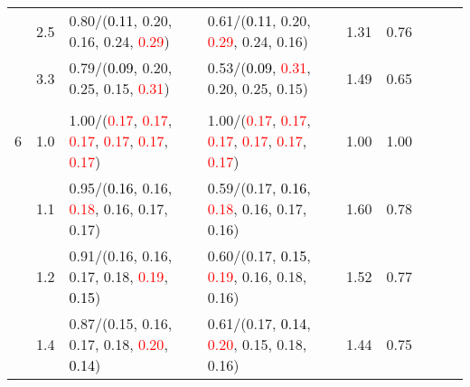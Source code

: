 \documentclass[10pt,a4paper]{report}
\begin{document}
\begin{table}[!htbp]
\begin{center}
{\begin{tabular}{ccllccccc}
				  & 2.5                               & 0.80/(\textcolor{black}{0.11}, 0.20, 0.16, 0.24, \textcolor{red}{0.29})                                                                         & 0.61/(\textcolor{black}{0.11}, 0.20, \textcolor{red}{0.29}, 0.24, 0.16)                                                                         & 1.31             & 0.76                     \\
				  & 3.3                               & 0.79/(\textcolor{black}{0.09}, 0.20, 0.25, 0.15, \textcolor{red}{0.31})                                                                         & 0.53/(\textcolor{black}{0.09}, \textcolor{red}{0.31}, 0.20, 0.25, 0.15)                                                                         & 1.49             & 0.65                     \\
				  &                                   &                                                                                                                                                 &                                                                                                                                                 &                                             \\
				6 & 1.0                               & 1.00/(\textcolor{red}{0.17}, \textcolor{red}{0.17}, \textcolor{red}{0.17}, \textcolor{red}{0.17}, \textcolor{red}{0.17}, \textcolor{red}{0.17}) & 1.00/(\textcolor{red}{0.17}, \textcolor{red}{0.17}, \textcolor{red}{0.17}, \textcolor{red}{0.17}, \textcolor{red}{0.17}, \textcolor{red}{0.17}) & 1.00             & 1.00                     \\
				  & 1.1                               & 0.95/(\textcolor{black}{0.16}, 0.16, \textcolor{red}{0.18}, 0.16, 0.17, 0.17)                                                                   & 0.59/(0.17, \textcolor{black}{0.16}, \textcolor{red}{0.18}, 0.16, 0.17, 0.16)                                                                   & 1.60             & 0.78                     \\
				  & 1.2                               & 0.91/(0.16, 0.16, 0.17, 0.18, \textcolor{red}{0.19}, \textcolor{black}{0.15})                                                                   & 0.60/(0.17, \textcolor{black}{0.15}, \textcolor{red}{0.19}, 0.16, 0.18, 0.16)                                                                   & 1.52             & 0.77                     \\
				  & 1.4                               & 0.87/(0.15, 0.16, 0.17, 0.18, \textcolor{red}{0.20}, \textcolor{black}{0.14})                                                                   & 0.61/(0.17, \textcolor{black}{0.14}, \textcolor{red}{0.20}, 0.15, 0.18, 0.16)                                                                   & 1.44             & 0.75                     \\

\end{tabular}}
\end{center}
\end{table}
\end{document}
